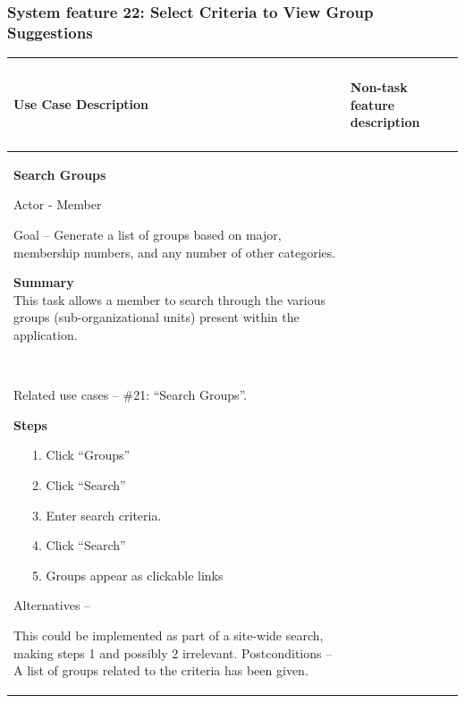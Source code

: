 \documentclass[letterpaper]{article}
\newcommand\textstyleDefaultParagraphFont[1]{#1}
\begin{document}
\subsubsection[System feature 22: Select Criteria to View Group
Suggestions]{\rmfamily System feature 22: Select Criteria to View Group
Suggestions}
\begin{flushleft}
\tablehead{}
\begin{supertabular}{|m{3.17056in}|m{3.1712599in}|}
\hline
\bfseries\color{black} Use Case Description &
\paragraph[Non{}-task feature
description]{\rmfamily Non-task feature
description}
\\\hline
{\bfseries\color{black} Search Groups}

{\color{black} Actor - Member}

{\color{black} Goal -- Generate a list of groups based on major,
membership numbers, and any number of other categories.}

{\color{black}
\textstyleDefaultParagraphFont{\textbf{Summary}}\textstyleDefaultParagraphFont{\textbf{\ \ }}\newline
\textstyleDefaultParagraphFont{This task allows a member to search
through the various groups (sub-organizational units) present within
the application.}}

~

{\color{black} Related use cases -- \#21: {\textquotedblleft}Search
Groups{\textquotedblright}.}

{\color{black} \textstyleDefaultParagraphFont{\textbf{Steps}}}

{\color{black} \ \ \ 1. Click
{\textquotedblleft}Groups{\textquotedblright} }

{\color{black} \ \ \ 2. Click
{\textquotedblleft}Search{\textquotedblright} }

{\color{black} \ \ \ 3. Enter search criteria.}

{\color{black} \ \ \ 4. Click
{\textquotedblleft}Search{\textquotedblright}}

{\color{black} \ \ \ 5. Groups appear as clickable links}

{\color{black} Alternatives -- }

\color{black} This could be implemented as part of a site-wide search,
making steps 1 and possibly 2 irrelevant.\newline
Postconditions -- A list of groups related to the criteria has been
given. &

\end{supertabular}
\end{flushleft}
\end{document}
